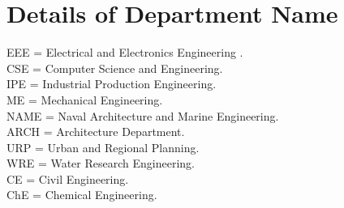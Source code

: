 
\chapter{Details of Department Name} %

\label{Appendix C} %

EEE = Electrical and Electronics Engineering .\\
CSE = Computer Science and Engineering.\\
IPE = Industrial Production Engineering.\\
ME = Mechanical Engineering.\\
NAME = Naval Architecture and Marine Engineering.\\
ARCH = Architecture Department.\\
URP = Urban and Regional Planning.\\
WRE = Water Research Engineering.\\
CE = Civil Engineering.\\
ChE = Chemical Engineering.\\ 